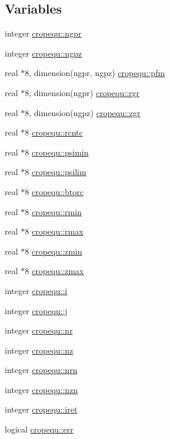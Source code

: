 \subsection*{Variables}
\begin{CompactItemize}
\item 
integer \hyperlink{namespacecropequ_b915d54338bbf1eef691e09d62c5ca74}{cropequ::ngpr}
\item 
integer \hyperlink{namespacecropequ_5e809f294cb46948b68e7f84c5b3e5e7}{cropequ::ngpz}
\item 
real $\ast$8, dimension(ngpr, ngpz) \hyperlink{namespacecropequ_5473fc74d051d894f0ec5d9f694b5a7c}{cropequ::pfm}
\item 
real $\ast$8, dimension(ngpr) \hyperlink{namespacecropequ_78c5274a895c892c290855610e3fe6dd}{cropequ::rgr}
\item 
real $\ast$8, dimension(ngpz) \hyperlink{namespacecropequ_ba94b950afefefed82de22487f2e6f95}{cropequ::zgr}
\item 
real $\ast$8 \hyperlink{namespacecropequ_847b9d7c0a63b3cf6f8c121587f8d128}{cropequ::rcntc}
\item 
real $\ast$8 \hyperlink{namespacecropequ_226aa64e7824a43774d5758f1cbbfdc3}{cropequ::psimin}
\item 
real $\ast$8 \hyperlink{namespacecropequ_39bc7b9e1955e30091891c1f2dbbea4d}{cropequ::psilim}
\item 
real $\ast$8 \hyperlink{namespacecropequ_2fa7545a4a2d563a0df549f2a29ad11f}{cropequ::btorc}
\item 
real $\ast$8 \hyperlink{namespacecropequ_cf78277c748724ebe92ec8527f5acc26}{cropequ::rmin}
\item 
real $\ast$8 \hyperlink{namespacecropequ_e0f2d36e258a08a73b6444150b9aac34}{cropequ::rmax}
\item 
real $\ast$8 \hyperlink{namespacecropequ_9a350ad968e30ba111940f451ea50702}{cropequ::zmin}
\item 
real $\ast$8 \hyperlink{namespacecropequ_ad2308c1d9ad8704c10ca1a8a65a44c0}{cropequ::zmax}
\item 
integer \hyperlink{namespacecropequ_29c60057cd3ac46029ead264faa6e632}{cropequ::i}
\item 
integer \hyperlink{namespacecropequ_91eff21312f6ddff6f7faf416d09a8a5}{cropequ::j}
\item 
integer \hyperlink{namespacecropequ_27fba5a93cdc5a7654bdf5667c178b15}{cropequ::nr}
\item 
integer \hyperlink{namespacecropequ_ffd518930bd0631a6a50368c71e950b4}{cropequ::nz}
\item 
integer \hyperlink{namespacecropequ_8343e4bb7153d2e5b304f677249a514a}{cropequ::nrn}
\item 
integer \hyperlink{namespacecropequ_d9c10ef53d2478403af28fcbabddebaa}{cropequ::nzn}
\item 
integer \hyperlink{namespacecropequ_f6dbf4b8794c7af19a050269451861e5}{cropequ::iret}
\item 
logical \hyperlink{namespacecropequ_a9edc1a57af22096446e628df43d5388}{cropequ::err}
\end{CompactItemize}


